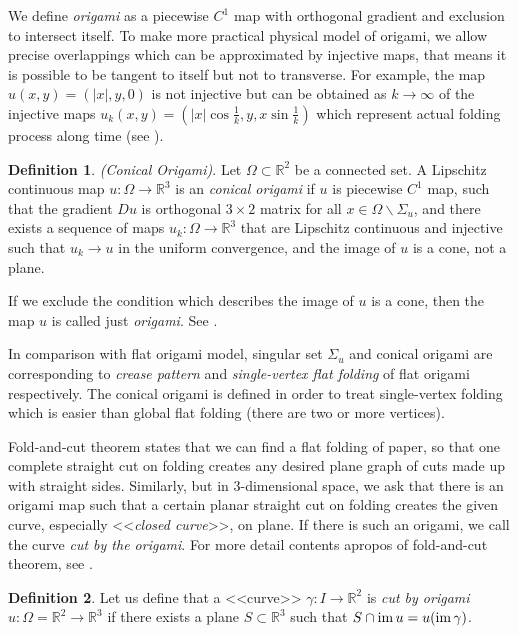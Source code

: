 \documentclass{amsart}
\theoremstyle{plain}
\theoremstyle{definition}
\newtheorem*{definition}{Definition}
\theoremstyle{remark}
\begin{document}
We define {\it origami} as a piecewise $C^1$ map with orthogonal gradient and exclusion to intersect itself.
To make more practical physical model of origami, we allow precise overlappings which can be approximated by injective maps, that means it is possible to be tangent to itself but not to transverse.
For example, the map $u(x,y)=(|x|,y,0)$ is not injective but can be obtained as $k\to\infty$ of the injective maps $u_k(x,y)=(|x|\cos\frac1k,y,x\sin\frac1k)$ which represent actual folding process along time (see \cite{Com}).


\begin{definition}%
{\it (Conical Origami)}.
Let $\Omega\subset {\mathbb R}^2$ be a connected set.
A Lipschitz continuous map $u:\Omega\to{\mathbb R}^3$ is an {\it conical origami} if $u$ is piecewise $C^1$ map, such that the gradient $Du$ is orthogonal $3\times2$ matrix for all $x\in\Omega\backslash\Sigma_u$, and there exists a sequence of maps $u_k:\Omega\to{\mathbb R}^3$ that are Lipschitz continuous and injective such that $u_k\to u$ in the uniform convergence, and the image of $u$ is a cone, not a plane.
\end{definition}

If we exclude the condition which describes the image of $u$ is a cone, then the map $u$ is called just {\it origami}.
See \cite{Lip}.

In comparison with flat origami model, singular set $\Sigma_u$ and conical origami are corresponding to {\it crease pattern} and {\it single-vertex flat folding} of flat origami respectively.
The conical origami is defined in order to treat single-vertex folding which is easier than global flat folding (there are two or more vertices).

Fold-and-cut theorem states that we can find a flat folding of paper, so that one complete straight cut on folding creates any desired plane graph of cuts made up with straight sides.
Similarly, but in 3-dimensional space, we ask that there is an origami map such that a certain planar straight cut on folding creates the given curve, especially <<{\it closed curve}>>, on plane.
If there is such an origami, we call the curve {\it cut by the origami}.
For more detail contents apropos of fold-and-cut theorem, see \cite{Fac}.


\begin{definition}%
Let us define that a <<curve>> $\gamma:I\to{\mathbb R}^2$ is {\it cut by origami $u:\Omega={\mathbb R}^2\to{\mathbb R}^3$} if there exists a plane $S\subset{\mathbb R}^3$ such that $S\cap{\rm im}\,u=u({\rm im}\,\gamma)$.
\end{definition}
\end{document}
